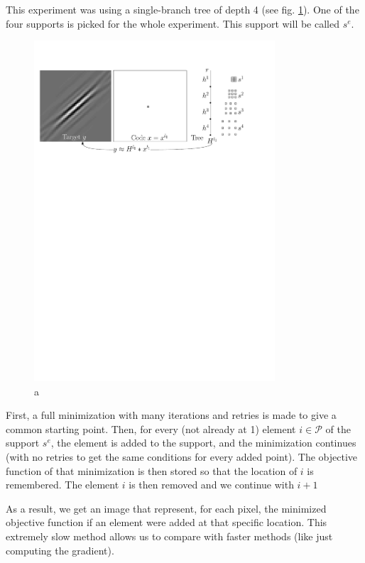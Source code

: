 This experiment was using a single-branch tree of depth 4 (see fig. \ref{fig_xp_pts_worth_adding}). One of the four supports is picked for the whole experiment. This support will be called $s^e$.
\begin{figure}[!ht]\centering
\includegraphics[width=0.8\textwidth]{figures/xp-pts-worth-adding.pdf}
\caption{a} \label{fig_xp_pts_worth_adding}
\end{figure}
First, a full minimization with many iterations and retries is made to give a common starting point. Then, for every (not already at 1) element $i \in \mathcal{P}$  of the support $s^e$, the element is added to the support, and the minimization continues (with no retries to get the same conditions for every added point).
The objective function of that minimization is then stored so that the location of $i$ is remembered. The element $i$ is then removed and we continue with $i+1$ %


As a result, we get an image that represent, for each pixel, the minimized objective function if an element were added at that specific location. This extremely slow method allows us to compare with faster methods (like just computing the gradient).


